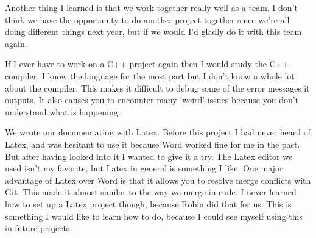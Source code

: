 Another thing I learned is that we work together really well as a team. I don’t think we have the opportunity to do another project together since we’re all doing different things next year, but if we would I’d gladly do it with this team again. 

If I ever have to work on a C++ project again then I would study the C++ compiler. I know the language for the most part but I don’t know a whole lot about the compiler. This makes it difficult to debug some of the error messages it outputs. It also causes you to encounter many ‘weird’ issues because you don’t understand what is happening.

We wrote our documentation with Latex. Before this project I had never heard of Latex, and was hesitant to use it because Word worked fine for me in the past. But after having looked into it I wanted to give it a try. The Latex editor we used isn’t my favorite, but Latex in general is something I like. One major advantage of Latex over Word is that it allows you to resolve merge conflicts with Git. This made it almost similar to the way we merge in code. I never learned how to set up a Latex project though, because Robin did that for us. This is something I would like to learn how to do, because I could see myself using this in future projects.
